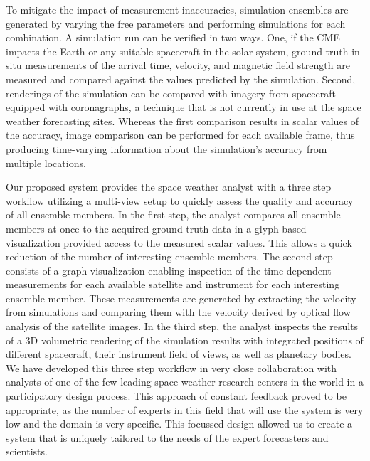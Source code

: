 \documentclass[journal]{vgtc}                %
\begin{document}
To mitigate the impact of measurement inaccuracies, simulation ensembles are generated by varying the free parameters and performing simulations for each combination. A simulation run can be verified in two ways. One, if the CME impacts the Earth or any suitable spacecraft in the solar system, ground-truth in-situ measurements of the arrival time, velocity, and magnetic field strength are measured and compared against the values predicted by the simulation. Second, renderings of the simulation can be compared with imagery from spacecraft equipped with coronagraphs, a technique that is not currently in use at the space weather forecasting sites. Whereas the first comparison results in scalar values of the accuracy, image comparison can be performed for each available frame, thus producing time-varying information about the simulation's accuracy from multiple locations.


Our proposed system provides the space weather analyst with a three step workflow utilizing a multi-view setup to quickly assess the quality and accuracy of all ensemble members. In the first step, the analyst compares all ensemble members at once to the acquired ground truth data in a glyph-based visualization provided access to the measured scalar values. This allows a quick reduction of the number of interesting ensemble members. The second step consists of a graph visualization enabling inspection of the time-dependent measurements for each available satellite and instrument for each interesting ensemble member. These measurements are generated by extracting the velocity from simulations and comparing them with the velocity derived by optical flow analysis of the satellite images. In the third step, the analyst inspects the results of a 3D volumetric rendering of the simulation results with integrated positions of different spacecraft, their instrument field of views, as well as planetary bodies. We have developed this three step workflow in very close collaboration with analysts of one of the few leading space weather research centers in the world in a participatory design process. This approach of  constant feedback proved to be appropriate, as the number of experts in this field that will use the system is very low and the domain is very specific. This focussed design allowed us to create a system that is uniquely tailored to the needs of the expert forecasters and scientists. 
\end{document}
